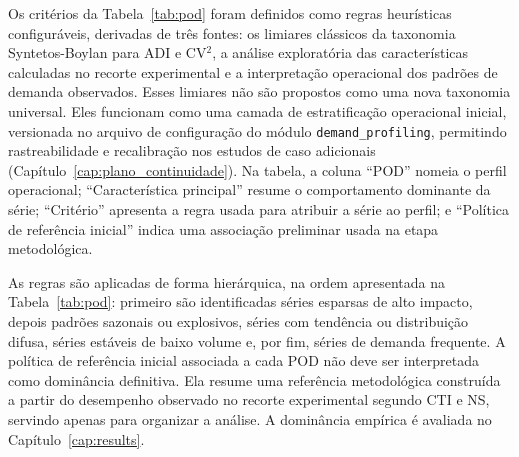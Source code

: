 Os critérios da Tabela~\ref{tab:pod} foram definidos como regras heurísticas configuráveis, derivadas de três fontes: os limiares clássicos da taxonomia Syntetos-Boylan para ADI e CV$^2$, a análise exploratória das características calculadas no recorte experimental e a interpretação operacional dos padrões de demanda observados. Esses limiares não são propostos como uma nova taxonomia universal. Eles funcionam como uma camada de estratificação operacional inicial, versionada no arquivo de configuração do módulo \texttt{demand\_profiling}, permitindo rastreabilidade e recalibração nos estudos de caso adicionais (Capítulo~\ref{cap:plano_continuidade}). Na tabela, a coluna ``POD'' nomeia o perfil operacional; ``Característica principal'' resume o comportamento dominante da série; ``Critério'' apresenta a regra usada para atribuir a série ao perfil; e ``Política de referência inicial'' indica uma associação preliminar usada na etapa metodológica.

\begin{table}[htbp]
\centering
\small
\caption{Perfis Operacionais de Demanda (POD) e políticas de referência inicial.}
\label{tab:pod}
\end{table}

As regras são aplicadas de forma hierárquica, na ordem apresentada na Tabela~\ref{tab:pod}: primeiro são identificadas séries esparsas de alto impacto, depois padrões sazonais ou explosivos, séries com tendência ou distribuição difusa, séries estáveis de baixo volume e, por fim, séries de demanda frequente. A política de referência inicial associada a cada POD não deve ser interpretada como dominância definitiva. Ela resume uma referência metodológica construída a partir do desempenho observado no recorte experimental segundo CTI e NS, servindo apenas para organizar a análise. A dominância empírica é avaliada no Capítulo~\ref{cap:results}.

